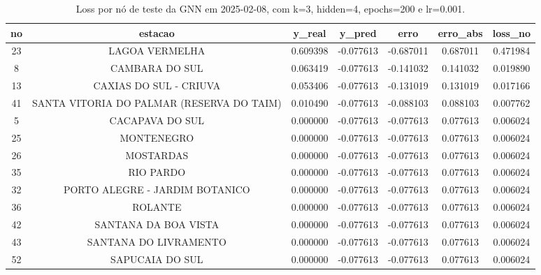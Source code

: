 \begin{table}[h]
\centering
\caption{Loss por nó de teste da GNN em 2025-02-08, com k=3, hidden=4, epochs=200 e lr=0.001.}
\label{tab:gnn_loss_nodes_k3_hidden4}
\begin{tabular}{ccccccc}
\toprule
no & estacao & y\_real & y\_pred & erro & erro\_abs & loss\_no \\
\midrule
23 & LAGOA VERMELHA & 0.609398 & -0.077613 & -0.687011 & 0.687011 & 0.471984 \\
8 & CAMBARA DO SUL & 0.063419 & -0.077613 & -0.141032 & 0.141032 & 0.019890 \\
13 & CAXIAS DO SUL - CRIUVA & 0.053406 & -0.077613 & -0.131019 & 0.131019 & 0.017166 \\
41 & SANTA VITORIA DO PALMAR (RESERVA DO TAIM) & 0.010490 & -0.077613 & -0.088103 & 0.088103 & 0.007762 \\
5 & CACAPAVA DO SUL & 0.000000 & -0.077613 & -0.077613 & 0.077613 & 0.006024 \\
25 & MONTENEGRO & 0.000000 & -0.077613 & -0.077613 & 0.077613 & 0.006024 \\
26 & MOSTARDAS & 0.000000 & -0.077613 & -0.077613 & 0.077613 & 0.006024 \\
35 & RIO PARDO & 0.000000 & -0.077613 & -0.077613 & 0.077613 & 0.006024 \\
32 & PORTO ALEGRE - JARDIM BOTANICO & 0.000000 & -0.077613 & -0.077613 & 0.077613 & 0.006024 \\
36 & ROLANTE & 0.000000 & -0.077613 & -0.077613 & 0.077613 & 0.006024 \\
42 & SANTANA DA BOA VISTA & 0.000000 & -0.077613 & -0.077613 & 0.077613 & 0.006024 \\
43 & SANTANA DO LIVRAMENTO & 0.000000 & -0.077613 & -0.077613 & 0.077613 & 0.006024 \\
52 & SAPUCAIA DO SUL & 0.000000 & -0.077613 & -0.077613 & 0.077613 & 0.006024 \\
\bottomrule
\end{tabular}
\end{table}
